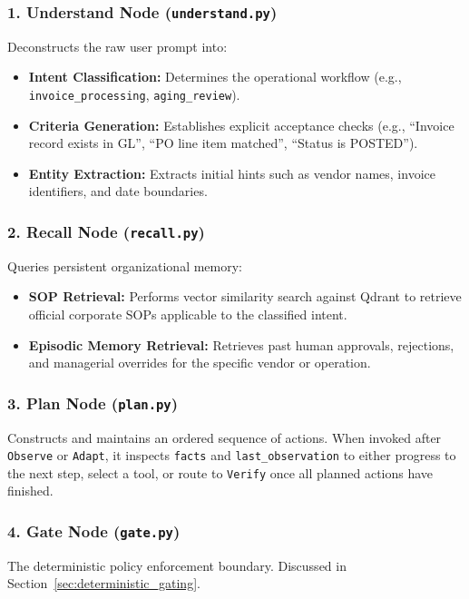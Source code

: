 \subsubsection{1. Understand Node (\texttt{understand.py})}
Deconstructs the raw user prompt into:
\begin{itemize}
  \item \textbf{Intent Classification:} Determines the operational workflow (e.g., \texttt{invoice\_processing}, \texttt{aging\_review}).
  \item \textbf{Criteria Generation:} Establishes explicit acceptance checks (e.g., ``Invoice record exists in GL'', ``PO line item matched'', ``Status is POSTED'').
  \item \textbf{Entity Extraction:} Extracts initial hints such as vendor names, invoice identifiers, and date boundaries.
\end{itemize}

\subsubsection{2. Recall Node (\texttt{recall.py})}
Queries persistent organizational memory:
\begin{itemize}
  \item \textbf{SOP Retrieval:} Performs vector similarity search against Qdrant to retrieve official corporate SOPs applicable to the classified intent.
  \item \textbf{Episodic Memory Retrieval:} Retrieves past human approvals, rejections, and managerial overrides for the specific vendor or operation.
\end{itemize}

\subsubsection{3. Plan Node (\texttt{plan.py})}
Constructs and maintains an ordered sequence of actions. When invoked after \texttt{Observe} or \texttt{Adapt}, it inspects \texttt{facts} and \texttt{last\_observation} to either progress to the next step, select a tool, or route to \texttt{Verify} once all planned actions have finished.

\subsubsection{4. Gate Node (\texttt{gate.py})}
The deterministic policy enforcement boundary. Discussed in Section~\ref{sec:deterministic_gating}.

